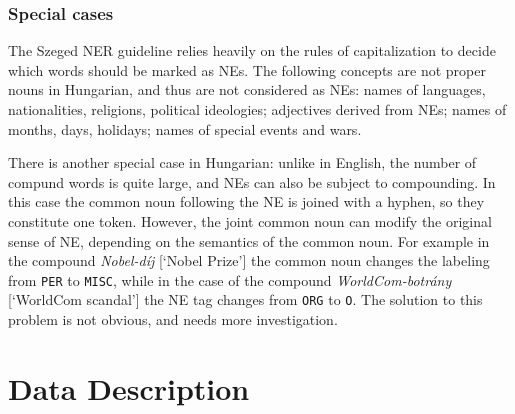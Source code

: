 \documentclass[11pt]{article}
\begin{document}
\subsubsection{Special cases}

The Szeged NER guideline relies heavily on the rules of capitalization to
decide which words should be marked as NEs. The following concepts are not
proper nouns in Hungarian, and thus are not considered as NEs: names of
languages, nationalities, religions, political ideologies; adjectives derived
from NEs; names of months, days, holidays; names of special events and wars.


There is another special case in Hungarian: unlike in English, the number of
compund words is quite large, and NEs can also be subject to compounding. In
this case the common noun following the NE is joined with a hyphen, so they
constitute one token. However, the joint common noun can modify the original
sense of NE, depending on the semantics of the common noun. For example in
the compound \textit{Nobel-díj} [`Nobel Prize'] the common noun changes the
labeling from \texttt{PER} to \texttt{MISC}, while
in the case of the compound \textit{WorldCom-botrány} [`WorldCom scandal'] the NE tag changes from \texttt{ORG} to \texttt{O}. The solution to this problem is not obvious, and needs more investigation.


\section{Data Description}
\label{sec:data}
\end{document}
